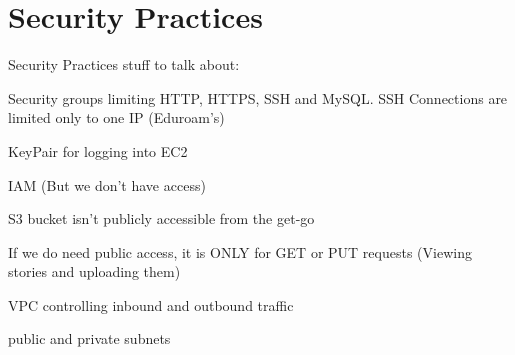 \chapter{Security Practices}\label{ch:security-practices}
Security Practices stuff to talk about:

Security groups limiting HTTP, HTTPS, SSH and MySQL. SSH Connections are limited only to one IP (Eduroam's)

KeyPair for logging into EC2

IAM (But we don't have access)

S3 bucket isn't publicly accessible from the get-go

If we do need public access, it is ONLY for GET or PUT requests (Viewing stories and uploading them)

VPC controlling inbound and outbound traffic

public and private subnets